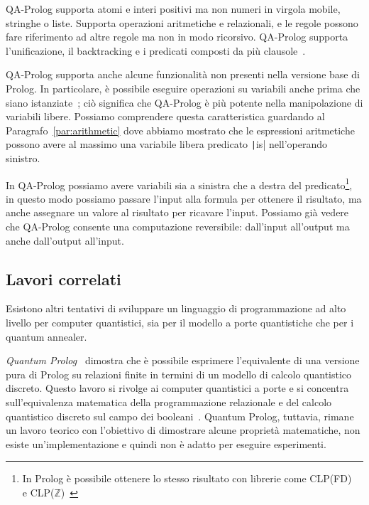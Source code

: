 QA-Prolog supporta atomi e interi positivi ma non numeri in virgola mobile, stringhe o liste. Supporta operazioni aritmetiche e relazionali, e le regole possono fare riferimento ad altre regole ma non in modo ricorsivo. QA-Prolog supporta l'unificazione, il backtracking e i predicati composti da più clausole~\cite{pakin2018performing}.

QA-Prolog supporta anche alcune funzionalità non presenti nella versione base di Prolog. In particolare, è possibile eseguire operazioni su variabili anche prima che siano istanziate~\cite{pakin2018performing}; ciò significa che QA-Prolog è più potente nella manipolazione di variabili libere. Possiamo comprendere questa caratteristica guardando al Paragrafo~\ref{par:arithmetic} dove abbiamo mostrato che le espressioni aritmetiche possono avere al massimo una variabile libera \textemdash{}predicato \texttt|is|\textemdash{} nell'operando sinistro. 

In QA-Prolog possiamo avere variabili sia a sinistra che a destra del predicato\footnote{In Prolog è possibile ottenere lo stesso risultato con librerie come CLP(FD)~\cite{triska2012finite, triska_clpfd_github} e CLP($\mathbb{Z}$)~\cite{triska_clpz_github}}, in questo modo possiamo passare l'input alla formula per ottenere il risultato, ma anche assegnare un valore al risultato per ricavare l'input. Possiamo già vedere che QA-Prolog consente una computazione reversibile: dall'input all'output ma anche dall'output all'input.

\subsection{Lavori correlati}
Esistono altri tentativi di sviluppare un linguaggio di programmazione ad alto livello per computer quantistici, sia per il modello a porte quantistiche che per i quantum annealer. 

\emph{Quantum Prolog}~\cite{james2011quantum} dimostra che è possibile esprimere l'equivalente di una versione pura di Prolog su relazioni finite in termini di un modello di calcolo quantistico discreto. Questo lavoro si rivolge ai computer quantistici a porte e si concentra sull'equivalenza matematica della programmazione relazionale e del calcolo quantistico discreto sul campo dei booleani~\cite{pakin2018performing}. Quantum Prolog, tuttavia, rimane un lavoro teorico con l'obiettivo di dimostrare alcune proprietà matematiche, non esiste un'implementazione e quindi non è adatto per eseguire esperimenti.

